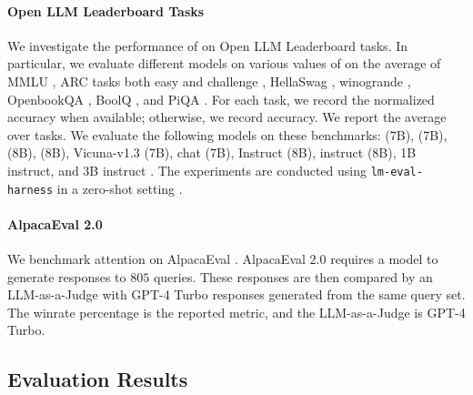 \paragraph{Open LLM Leaderboard Tasks}\label{sec:lm_eval_details} We investigate the performance of \topk on Open LLM Leaderboard tasks. In particular, we evaluate different models on various values of \kk on the average of MMLU \citep{hendrycks2020measuring-MMLU}, ARC tasks both easy and challenge \citep{clark2018arc}, HellaSwag \citep{zellers-etal-2019-hellaswag}, winogrande \citep{ai2:winogrande}, OpenbookQA \citep{OpenBookQA2018}, BoolQ \citep{clark2019boolq}, and PiQA \citep{Bisk2020}. For each task, we record the normalized accuracy when available; otherwise, we record accuracy. We report the average over tasks. We evaluate the following models on these benchmarks:  (7B),  (7B),  (8B),  (8B), Vicuna-v1.3 (7B),  chat (7B),  Instruct (8B),  instruct (8B),  1B instruct, and  3B instruct \citep{touvron2023llama, zheng2023judging, touvron2023llama2, dubey2024llama, Meta2024llama3_2}. The experiments are conducted using \texttt{lm-eval-harness} in a zero-shot setting \citep{eval-harness}. 

\paragraph{AlpacaEval 2.0} We benchmark \topk attention on AlpacaEval \citep{dubois2024length}. AlpacaEval $2.0$ requires a model to generate responses to $805$ queries. These responses are then compared by an LLM-as-a-Judge with GPT-4 Turbo responses generated from the same query set. The winrate percentage is the reported metric, and the LLM-as-a-Judge is GPT-4 Turbo. 

\subsection{Evaluation Results}


